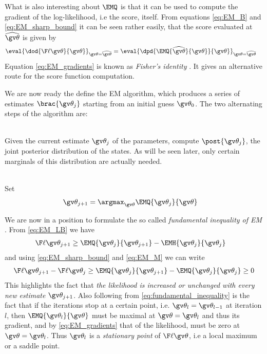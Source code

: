 What is also interesting about $\EMQ$ is that it can be used to compute the gradient of the log-likelihood, i.e
the score, itself. From equations \eqref{eq:EM_B}
and \eqref{eq:EM_sharp_bound} it can be seen rather easily, that  
the score evaluated at $\widehat{\Th}$ is given by
\begin{align}
		\eval{\dod{\lLH}{\Th}}_{\Th=\widehat\Th}&=
		\eval{\dpd{ \EMQ{\widehat\Th}{\Th}}{\Th}}_{\Th=\widehat\Th} \label{eq:EM_gradients}
\end{align} 
Equation \eqref{eq:EM_gradients} is known as \emph{Fisher's identity} \parencite{Cappe2005}. It gives
an alternative route for the score function computation.
 

We are now ready the define the EM algorithm, 
which produces a series of estimates $\brac{\Th_j}$
starting from an initial guess $\Th_0$. The two alternating
steps of the algorithm are:

\begin{description}
\addtolength{\leftskip}{1cm}
  \item[E-step]\hfill\\
  Given the current estimate $\Th_j$ of the parameters, compute	
  $\post{\Th_j}$, the joint posterior distribution of the states. 
  As will be seen later, only certain marginals of this distribution
  are actually needed.  
  \item[M-step]\hfill\\ 
  Set
    \begin{align}
		\Th_{j+1}&=\argmax_{\Th}\EMQ{\Th_j}{\Th} \label{eq:EM_M}
	\end{align}
\end{description}
We are now in a position to formulate the so called \emph{fundamental inequality of EM} \parencite{Cappe2005}.
From \eqref{eq:EM_LB} we have
\begin{align*}
	\lLH[\Th_{j+1}] & \geq \EMQ{\Th_j}{\Th_{j+1}} - \EMH{\Th_j}{\Th_{j}}
\end{align*}
and using \eqref{eq:EM_sharp_bound} and \eqref{eq:EM_M} we can write
\begin{align}
\label{eq:fundamental_inequality}	
\begin{split}	
	\lLH[\Th_{j+1}] - \lLH[\Th_j] & \geq \EMQ{\Th_j}{\Th_{j+1}} - \EMQ{\Th_j}{\Th_{j}} \geq 0\\
\end{split}
\end{align}
This highlights
the fact that \emph{the likelihood is increased or unchanged with every new estimate} $\Th_{j+1}$.
Also following from \eqref{eq:fundamental_inequality} is the fact that if the iterations
stop at a certain point, i.e. $\Th_{l}=\Th_{l-1}$ at iteration $l$, then
$\EMQ{\Th_l}{\Th}$ must be maximal at $\Th=\Th_l$ and thus its gradient, and 
by \eqref{eq:EM_gradients} that of the likelihood, must be zero at $\Th=\Th_l$. Thus
$\Th_l$ is a \emph{stationary point} of $\lLH$, i.e a local maximum or a saddle point.

